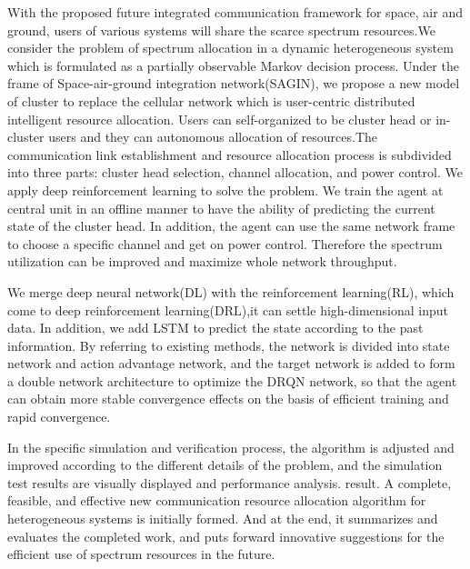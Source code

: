 \begin{eabstract}
   
   With the proposed future integrated communication framework for space, air and ground, users of various systems will share the scarce spectrum resources.We consider the problem of spectrum allocation in a dynamic heterogeneous system which is formulated as a partially observable Markov decision process. Under the frame of Space-air-ground integration network(SAGIN), we propose a new model of cluster to replace the cellular network which is user-centric distributed intelligent resource allocation. Users can self-organized to be cluster head or in-cluster users and they can autonomous allocation of resources.The communication link establishment and resource allocation process is subdivided into three parts: cluster head selection, channel allocation, and power control. We apply deep reinforcement learning to solve the problem. We train the agent at central unit in an offline manner to have the ability of predicting the current state of the cluster head. In addition, the agent can use the same network frame to choose a specific channel and get on power control. Therefore the spectrum utilization can be improved and maximize whole network throughput.
   
   We merge deep neural network(DL) with the reinforcement learning(RL), which come to deep reinforcement learning(DRL),it can settle high-dimensional input data. In addition, we add LSTM to predict the state according to the past information. By referring to existing methods, the network is divided into state network and action advantage network, and the target network is added to form a double network architecture to optimize the DRQN network, so that the agent can obtain more stable convergence effects on the basis of efficient training and rapid convergence. 

   In the specific simulation and verification process, the algorithm is adjusted and improved according to the different details of the problem, and the simulation test results are visually displayed and performance analysis. result. A complete, feasible, and effective new communication resource allocation algorithm for heterogeneous systems is initially formed. And at the end, it summarizes and evaluates the completed work, and puts forward innovative suggestions for the efficient use of spectrum resources in the future.
\end{eabstract}
